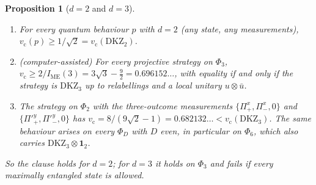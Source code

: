 \documentclass[11pt]{amsart}
\newtheorem{proposition}[theorem]{Proposition}
\theoremstyle{definition}
\theoremstyle{remark}
\numberwithin{equation}{section}
\newcommand{\IME}{I_{\mathrm{ME}}}
\newcommand{\one}{\mathbf{1}}
\newcommand{\vc}{v_{\mathrm c}}
\newcommand{\DKZ}{\mathrm{DKZ}}
\begin{document}
\begin{proposition}[$d=2$ and $d=3$]\label{prop:small}
\begin{enumerate}
\item For every quantum behaviour $p$ with $d=2$ (any state, any measurements), $\vc(p)\ge1/\sqrt2=\vc(\DKZ_2)$.
\item (computer-assisted) For every projective strategy on $\Phi_3$, $\vc\ge2/\IME(3)=3\sqrt3-\frac92=0.696152\ldots$,
with equality if and only if the strategy is $\DKZ_3$ up to relabellings and a local unitary $u\otimes\bar u$.
\item The strategy on $\Phi_2$ with the three-outcome measurements $\{\Pi^x_+,\Pi^x_-,0\}$ and $\{\Pi'^y_+,\Pi'^y_-,0\}$
has $\vc=8/(9\sqrt2-1)=0.682132\ldots<\vc(\DKZ_3)$. The same behaviour arises on every $\Phi_D$ with $D$ even, in
particular on $\Phi_6$, which also carries $\DKZ_3\otimes\one_2$.
\end{enumerate}
So the clause holds for $d=2$; for $d=3$ it holds on $\Phi_3$ and fails if every maximally entangled state is allowed.
\end{proposition}
\end{document}
